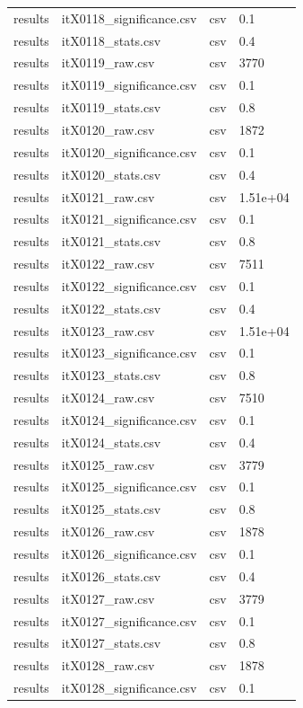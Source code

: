 \begin{landscape}
\begin{longtable}{p{}p{}p{}p{}}
results & itX0118\_significance.csv & csv & 0.1 \\
results & itX0118\_stats.csv & csv & 0.4 \\
results & itX0119\_raw.csv & csv & 3770 \\
results & itX0119\_significance.csv & csv & 0.1 \\
results & itX0119\_stats.csv & csv & 0.8 \\
results & itX0120\_raw.csv & csv & 1872 \\
results & itX0120\_significance.csv & csv & 0.1 \\
results & itX0120\_stats.csv & csv & 0.4 \\
results & itX0121\_raw.csv & csv & 1.51e+04 \\
results & itX0121\_significance.csv & csv & 0.1 \\
results & itX0121\_stats.csv & csv & 0.8 \\
results & itX0122\_raw.csv & csv & 7511 \\
results & itX0122\_significance.csv & csv & 0.1 \\
results & itX0122\_stats.csv & csv & 0.4 \\
results & itX0123\_raw.csv & csv & 1.51e+04 \\
results & itX0123\_significance.csv & csv & 0.1 \\
results & itX0123\_stats.csv & csv & 0.8 \\
results & itX0124\_raw.csv & csv & 7510 \\
results & itX0124\_significance.csv & csv & 0.1 \\
results & itX0124\_stats.csv & csv & 0.4 \\
results & itX0125\_raw.csv & csv & 3779 \\
results & itX0125\_significance.csv & csv & 0.1 \\
results & itX0125\_stats.csv & csv & 0.8 \\
results & itX0126\_raw.csv & csv & 1878 \\
results & itX0126\_significance.csv & csv & 0.1 \\
results & itX0126\_stats.csv & csv & 0.4 \\
results & itX0127\_raw.csv & csv & 3779 \\
results & itX0127\_significance.csv & csv & 0.1 \\
results & itX0127\_stats.csv & csv & 0.8 \\
results & itX0128\_raw.csv & csv & 1878 \\
results & itX0128\_significance.csv & csv & 0.1 \\

\end{longtable}
\end{landscape}
